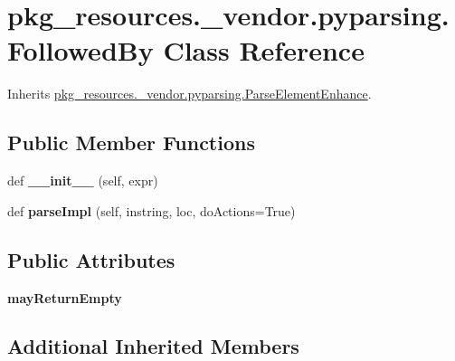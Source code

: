 \hypertarget{classpkg__resources_1_1__vendor_1_1pyparsing_1_1_followed_by}{}\section{pkg\+\_\+resources.\+\_\+vendor.\+pyparsing.\+Followed\+By Class Reference}
\label{classpkg__resources_1_1__vendor_1_1pyparsing_1_1_followed_by}


Inherits \hyperlink{classpkg__resources_1_1__vendor_1_1pyparsing_1_1_parse_element_enhance}{pkg\+\_\+resources.\+\_\+vendor.\+pyparsing.\+Parse\+Element\+Enhance}.

\subsection*{Public Member Functions}
\begin{DoxyCompactItemize}
\item 
\mbox{\label{classpkg__resources_1_1__vendor_1_1pyparsing_1_1_followed_by_a53882c8e865062317a4af097f0d8aad6}} 
def {\bfseries \+\_\+\+\_\+init\+\_\+\+\_\+} (self, expr)
\item 
\mbox{\label{classpkg__resources_1_1__vendor_1_1pyparsing_1_1_followed_by_a7d1cff50ee7bef3e95bf560539815130}} 
def {\bfseries parse\+Impl} (self, instring, loc, do\+Actions=True)
\end{DoxyCompactItemize}
\subsection*{Public Attributes}
\begin{DoxyCompactItemize}
\item 
\mbox{\label{classpkg__resources_1_1__vendor_1_1pyparsing_1_1_followed_by_ac74195f91b3cfc49816f452733e22711}} 
{\bfseries may\+Return\+Empty}
\end{DoxyCompactItemize}
\subsection*{Additional Inherited Members}


